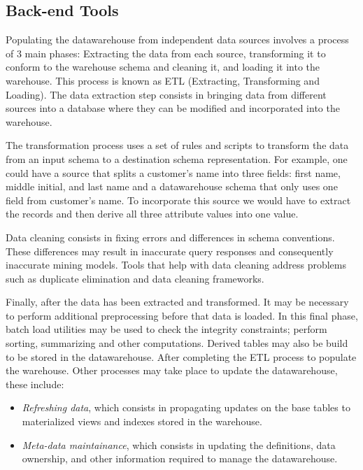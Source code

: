 \documentclass[]{article}
\begin{document}

\subsection{Back-end Tools} %
\label{sub:back_end_tools}
Populating the datawarehouse from independent data sources involves a process of 3 main phases: Extracting the data from each source,
transforming it to conform to the warehouse schema and cleaning it, and loading it into the warehouse. This process is known as ETL
(Extracting, Transforming and Loading).
The data extraction step consists in bringing data from different sources into a database where they can be modified and incorporated
into the warehouse.

The transformation process uses a set of rules and scripts to transform the data from an input schema to a destination schema
representation. For example, one could have a source that splits a customer's name into three fields: first name, middle initial, and
last name and a datawarehouse schema that only uses one field from customer's name. To incorporate this source we would have to extract
the records and then derive all three attribute values into one value. 

Data cleaning consists in fixing errors and differences in schema conventions. These differences may result in inaccurate query
responses and consequently inaccurate mining models. Tools that help with data cleaning address problems such as duplicate elimination
and data cleaning frameworks.

Finally, after the data has been extracted and transformed. It may be necessary to perform additional preprocessing before that data is
loaded. In this final phase, batch load utilities may be used to check the integrity constraints; perform sorting, summarizing and other
computations. Derived tables may also be build to be stored in the datawarehouse. After completing the ETL process to populate the
warehouse. Other processes may take place to update the datawarehouse, these include:
\begin{itemize}
	\item \emph{Refreshing data}, which consists in propagating updates on the base tables to materialized views and indexes stored in the warehouse.
	\item \emph{Meta-data maintainance}, which consists in updating the definitions, data ownership, and other information required to manage the datawarehouse. 
\end{itemize}




\end{document}

